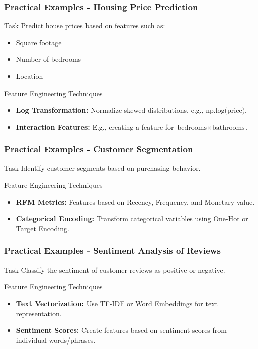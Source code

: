 \documentclass[aspectratio=169]{beamer}
\begin{document}
\begin{frame}[fragile]
  \frametitle{Practical Examples - Housing Price Prediction}
  \begin{block}{Task}
    Predict house prices based on features such as:
  \end{block}
  \begin{itemize}
    \item Square footage
    \item Number of bedrooms
    \item Location
  \end{itemize}
  \begin{block}{Feature Engineering Techniques}
    \begin{itemize}
      \item \textbf{Log Transformation:} Normalize skewed distributions, e.g., \( \text{np.log(price)} \).
      \item \textbf{Interaction Features:} E.g., creating a feature for \( \text{bedrooms} \times \text{bathrooms} \).
    \end{itemize}
  \end{block}
\end{frame}

\begin{frame}[fragile]
  \frametitle{Practical Examples - Customer Segmentation}
  \begin{block}{Task}
    Identify customer segments based on purchasing behavior.
  \end{block}
  \begin{block}{Feature Engineering Techniques}
    \begin{itemize}
      \item \textbf{RFM Metrics:} Features based on Recency, Frequency, and Monetary value.
      \item \textbf{Categorical Encoding:} Transform categorical variables using One-Hot or Target Encoding.
    \end{itemize}
  \end{block}
\end{frame}

\begin{frame}[fragile]
  \frametitle{Practical Examples - Sentiment Analysis of Reviews}
  \begin{block}{Task}
    Classify the sentiment of customer reviews as positive or negative.
  \end{block}
  \begin{block}{Feature Engineering Techniques}
    \begin{itemize}
      \item \textbf{Text Vectorization:} Use TF-IDF or Word Embeddings for text representation.
      \item \textbf{Sentiment Scores:} Create features based on sentiment scores from individual words/phrases.
    \end{itemize}
  \end{block}
\end{frame}
\end{document}
